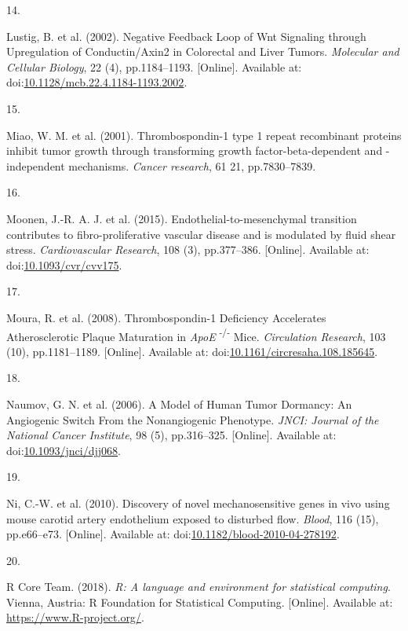 \documentclass[
  11pt,
]{article}
\newlength{\cslhangindent}
\newlength{\csllabelwidth}
\newlength{\cslentryspacingunit} %
\newenvironment{CSLReferences}[2] %
 {%
  \setlength{\parindent}{0pt}
  \ifodd #1
  \let\oldpar\par
  \def\par{\hangindent=\cslhangindent\oldpar}
  \fi
  \setlength{\parskip}{#2\cslentryspacingunit}
 }%
 {}
\newcommand{\CSLLeftMargin}[1]{\parbox[t]{\csllabelwidth}{#1}}
\newcommand{\CSLRightInline}[1]{\parbox[t]{\linewidth - \csllabelwidth}{#1}\break}
\begin{document}
\begin{CSLReferences}{0}{0}
\leavevmode{}%
\CSLLeftMargin{14. }
\CSLRightInline{Lustig, B. {et al.} (2002). {Negative Feedback Loop of Wnt Signaling through Upregulation of Conductin/Axin2 in Colorectal and Liver Tumors}. \emph{Molecular and Cellular Biology}, 22 (4), pp.1184--1193. {[}Online{]}. Available at: doi:\href{https://doi.org/10.1128/mcb.22.4.1184-1193.2002}{10.1128/mcb.22.4.1184-1193.2002}.}

\leavevmode{}%
\CSLLeftMargin{15. }
\CSLRightInline{Miao, W. M. {et al.} (2001). {Thrombospondin-1 type 1 repeat recombinant proteins inhibit tumor growth through transforming growth factor-beta-dependent and -independent mechanisms.} \emph{Cancer research}, 61 21, pp.7830--7839.}

\leavevmode{}%
\CSLLeftMargin{16. }
\CSLRightInline{Moonen, J.-R. A. J. {et al.} (2015). {Endothelial-to-mesenchymal transition contributes to fibro-proliferative vascular disease and is modulated by fluid shear stress}. \emph{Cardiovascular Research}, 108 (3), pp.377--386. {[}Online{]}. Available at: doi:\href{https://doi.org/10.1093/cvr/cvv175}{10.1093/cvr/cvv175}.}

\leavevmode{}%
\CSLLeftMargin{17. }
\CSLRightInline{Moura, R. {et al.} (2008). {Thrombospondin-1 Deficiency Accelerates Atherosclerotic Plaque Maturation in {\emph{ApoE}} {\textsuperscript{{-}/{-}}} Mice}. \emph{Circulation Research}, 103 (10), pp.1181--1189. {[}Online{]}. Available at: doi:\href{https://doi.org/10.1161/circresaha.108.185645}{10.1161/circresaha.108.185645}.}

\leavevmode{}%
\CSLLeftMargin{18. }
\CSLRightInline{Naumov, G. N. {et al.} (2006). {A Model of Human Tumor Dormancy: An Angiogenic Switch From the Nonangiogenic Phenotype}. \emph{JNCI: Journal of the National Cancer Institute}, 98 (5), pp.316--325. {[}Online{]}. Available at: doi:\href{https://doi.org/10.1093/jnci/djj068}{10.1093/jnci/djj068}.}

\leavevmode{}%
\CSLLeftMargin{19. }
\CSLRightInline{Ni, C.-W. {et al.} (2010). {Discovery of novel mechanosensitive genes in vivo using mouse carotid artery endothelium exposed to disturbed flow}. \emph{Blood}, 116 (15), pp.e66--e73. {[}Online{]}. Available at: doi:\href{https://doi.org/10.1182/blood-2010-04-278192}{10.1182/blood-2010-04-278192}.}

\leavevmode{}%
\CSLLeftMargin{20. }
\CSLRightInline{R Core Team. (2018). {\emph{R: A language and environment for statistical computing}}. Vienna, Austria: R Foundation for Statistical Computing. {[}Online{]}. Available at: \url{https://www.R-project.org/}.}


\end{CSLReferences}
\end{document}
